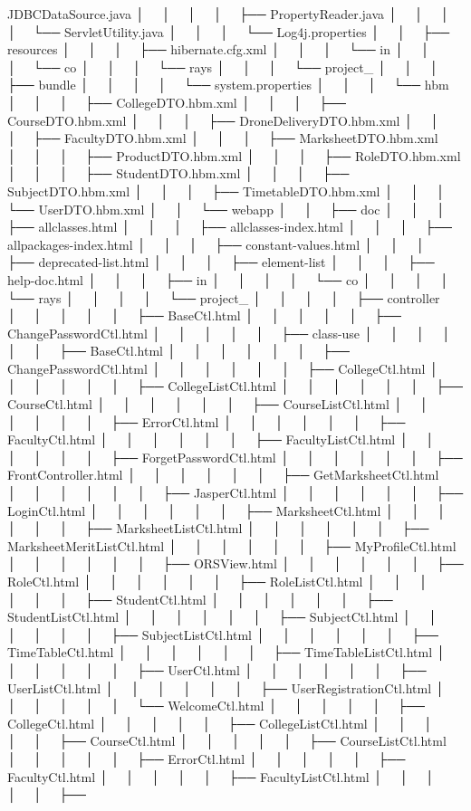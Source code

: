 JDBCData\+Source.\+java │   │   │   │   ├── Property\+Reader.\+java │   │   │   │   └── Servlet\+Utility.\+java │   │   │   └── Log4j.\+properties │   │   ├── resources │   │   │   ├── hibernate.\+cfg.\+xml │   │   │   └── in │   │   │   └── co │   │   │   └── rays │   │   │   └── project\+\_ │   │   │   ├── bundle │   │   │   │   └── system.\+properties │   │   │   └── hbm │   │   │   ├── College\+DTO.\+hbm.\+xml │   │   │   ├── Course\+DTO.\+hbm.\+xml │   │   │   ├── Drone\+Delivery\+DTO.\+hbm.\+xml │   │   │   ├── Faculty\+DTO.\+hbm.\+xml │   │   │   ├── Marksheet\+DTO.\+hbm.\+xml │   │   │   ├── Product\+DTO.\+hbm.\+xml │   │   │   ├── Role\+DTO.\+hbm.\+xml │   │   │   ├── Student\+DTO.\+hbm.\+xml │   │   │   ├── Subject\+DTO.\+hbm.\+xml │   │   │   ├── Timetable\+DTO.\+hbm.\+xml │   │   │   └── User\+DTO.\+hbm.\+xml │   │   └── webapp │   │   ├── doc │   │   │   ├── allclasses.\+html │   │   │   ├── allclasses-\/index.\+html │   │   │   ├── allpackages-\/index.\+html │   │   │   ├── constant-\/values.\+html │   │   │   ├── deprecated-\/list.\+html │   │   │   ├── element-\/list │   │   │   ├── help-\/doc.\+html │   │   │   ├── in │   │   │   │   └── co │   │   │   │   └── rays │   │   │   │   └── project\+\_ │   │   │   │   ├── controller │   │   │   │   │   ├── Base\+Ctl.\+html │   │   │   │   │   ├── Change\+Password\+Ctl.\+html │   │   │   │   │   ├── class-\/use │   │   │   │   │   │   ├── Base\+Ctl.\+html │   │   │   │   │   │   ├── Change\+Password\+Ctl.\+html │   │   │   │   │   │   ├── College\+Ctl.\+html │   │   │   │   │   │   ├── College\+List\+Ctl.\+html │   │   │   │   │   │   ├── Course\+Ctl.\+html │   │   │   │   │   │   ├── Course\+List\+Ctl.\+html │   │   │   │   │   │   ├── Error\+Ctl.\+html │   │   │   │   │   │   ├── Faculty\+Ctl.\+html │   │   │   │   │   │   ├── Faculty\+List\+Ctl.\+html │   │   │   │   │   │   ├── Forget\+Password\+Ctl.\+html │   │   │   │   │   │   ├── Front\+Controller.\+html │   │   │   │   │   │   ├── Get\+Marksheet\+Ctl.\+html │   │   │   │   │   │   ├── Jasper\+Ctl.\+html │   │   │   │   │   │   ├── Login\+Ctl.\+html │   │   │   │   │   │   ├── Marksheet\+Ctl.\+html │   │   │   │   │   │   ├── Marksheet\+List\+Ctl.\+html │   │   │   │   │   │   ├── Marksheet\+Merit\+List\+Ctl.\+html │   │   │   │   │   │   ├── My\+Profile\+Ctl.\+html │   │   │   │   │   │   ├── ORSView.\+html │   │   │   │   │   │   ├── Role\+Ctl.\+html │   │   │   │   │   │   ├── Role\+List\+Ctl.\+html │   │   │   │   │   │   ├── Student\+Ctl.\+html │   │   │   │   │   │   ├── Student\+List\+Ctl.\+html │   │   │   │   │   │   ├── Subject\+Ctl.\+html │   │   │   │   │   │   ├── Subject\+List\+Ctl.\+html │   │   │   │   │   │   ├── Time\+Table\+Ctl.\+html │   │   │   │   │   │   ├── Time\+Table\+List\+Ctl.\+html │   │   │   │   │   │   ├── User\+Ctl.\+html │   │   │   │   │   │   ├── User\+List\+Ctl.\+html │   │   │   │   │   │   ├── User\+Registration\+Ctl.\+html │   │   │   │   │   │   └── Welcome\+Ctl.\+html │   │   │   │   │   ├── College\+Ctl.\+html │   │   │   │   │   ├── College\+List\+Ctl.\+html │   │   │   │   │   ├── Course\+Ctl.\+html │   │   │   │   │   ├── Course\+List\+Ctl.\+html │   │   │   │   │   ├── Error\+Ctl.\+html │   │   │   │   │   ├── Faculty\+Ctl.\+html │   │   │   │   │   ├── Faculty\+List\+Ctl.\+html │   │   │   │   │   ├── 